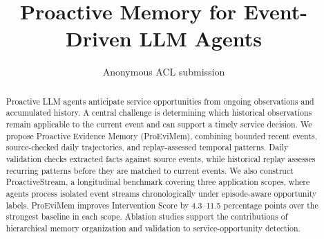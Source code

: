 \documentclass[11pt]{article}
\title{Proactive Memory for Event-Driven LLM Agents}
\author{Anonymous ACL submission}
\newcommand{\system}{ProEviMem}
\begin{document}
\maketitle

\begin{abstract}
Proactive LLM agents anticipate service opportunities from ongoing observations and accumulated history.
A central challenge is determining which historical observations remain applicable to the current event and can support a timely service decision.
We propose Proactive Evidence Memory (\system{}), combining bounded recent events, source-checked daily trajectories, and replay-assessed temporal patterns.
Daily validation checks extracted facts against source events, while historical replay assesses recurring patterns before they are matched to current events.
We also construct ProactiveStream, a longitudinal benchmark covering three application scopes, where agents process isolated event streams chronologically under episode-aware opportunity labels.
\system{} improves Intervention Score by 4.3--11.5 percentage points over the strongest baseline in each scope.
Ablation studies support the contributions of hierarchical memory organization and validation to service-opportunity detection.
\end{abstract}








\FloatBarrier

\label{sec:main_end}




\clearpage
\appendix


\end{document}
